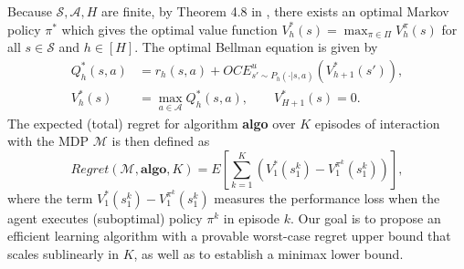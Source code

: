 \documentclass[11pt]{article}
\newcommand{\1}{\mathbbm{1}}
\begin{document}






Because $\mathcal{S},\mathcal{A},H$ are finite, by Theorem 4.8 in \cite{bauerle2022markov}, there exists an optimal Markov policy $\pi^*$ which gives the optimal value function $V^*_h(s)=\max_{\pi\in \mathcal{\varPi}}V_h^{\pi}(s)$ for all $ s\in \mathcal{S}$ and $h\in [H]$. The optimal Bellman equation is given by
\begin{align}
Q_h^*(s,a) & =r_h(s,a)+OCE^{u}_{s'\sim P_h(\cdot\vert s,a)}(V^*_{h+1}(s')), \\
V_h^*(s) & =\max_{a\in \mathcal{A}}Q_h^*(s,a), \quad \quad V_{H+1}^*(s)=0.
\end{align}
The expected (total) regret for algorithm \textbf{algo} over $K$ episodes of interaction with the MDP $\mathcal{M}$ is then defined as 
\begin{equation}\label{eq:regret}
Regret(\mathcal{M},\textbf{algo},K)=E\left [\sum_{k=1}^K(V_1^*(s_1^k)-V_1^{\pi^k}(s_1^k))\right ],
\end{equation}
where the term $V_1^*(s_1^k)-V_1^{\pi^k}(s_1^k)$ measures the performance loss when the agent executes (suboptimal) policy $\pi^k$ in episode $k$. 
Our goal is to propose an efficient learning algorithm with a provable worst-case regret upper bound that scales sublinearly in $K$, as well as to establish a minimax lower bound. 
\end{document}
